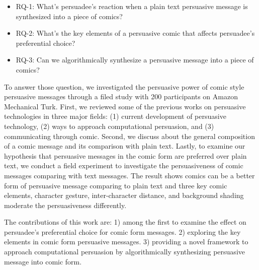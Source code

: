 \begin{itemize}
    \item RQ-1: What's persuadee's reaction when a plain text persuasive message is synthesized into a piece of comics?
    \item RQ-2: What's the key elements of a persuasive comic that affects persuadee's preferential choice?
    \item RQ-3: Can we algorithmically synthesize a persuasive message into a piece of comics?
\end{itemize}
To answer those question, we investigated the persuasive power of comic style persuasive messages through a filed study with 200 participants on Amazon Mechanical Turk. First, we reviewed some of the previous works on persuasive technologies in three major fields: (1) current development of persuasive technology, (2) ways to approach computational persuasion, and (3) communicating through comic. Second, we discuss about the general composition of a comic message and its comparison with plain text. Lastly, to examine our hypothesis that persuasive messages in the comic form are preferred over plain text, we conduct a field experiment to investigate the persuasiveness of comic messages comparing with text messages. The result shows comics can be a better form of persuasive message comparing to plain text and three key comic elements, character gesture, inter-character distance, and background shading moderate the persuasiveness differently.\par

The contributions of this work are: 1) among the first to examine the effect on persuadee's preferential choice for comic form messages. 2) exploring the key elements in comic form persuasive messages. 3) providing a novel framework to approach computational persuasion by algorithmically synthesizing persuasive message into comic form. \par
